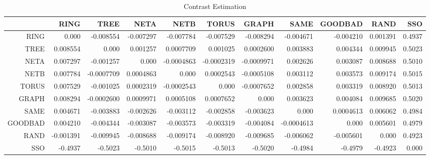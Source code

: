 \documentclass[a4paper,10pt]{article}
\begin{document}
\begin{landscape}
\begin{table}[!htp]
\centering\tiny
\caption{Contrast Estimation}
\begin{tabular}{
|r|r|r|r|r|r|r|r|r|r|r|}
\hline
 & RING& TREE& NETA& NETB& TORUS& GRAPH& SAME& GOODBAD& RAND& SSO\\
\hline
 RING&0.000&-0.008554&-0.007297&-0.007784&-0.007529&-0.008294&-0.004671&-0.004210&0.001391&0.4937\\
\hline
 TREE&0.008554&0.000&0.001257&0.0007709&0.001025&0.0002600&0.003883&0.004344&0.009945&0.5023\\
\hline
 NETA&0.007297&-0.001257&0.000&-0.0004863&-0.0002319&-0.0009971&0.002626&0.003087&0.008688&0.5010\\
\hline
 NETB&0.007784&-0.0007709&0.0004863&0.000&0.0002543&-0.0005108&0.003112&0.003573&0.009174&0.5015\\
\hline
 TORUS&0.007529&-0.001025&0.0002319&-0.0002543&0.000&-0.0007652&0.002858&0.003319&0.008920&0.5013\\
\hline
 GRAPH&0.008294&-0.0002600&0.0009971&0.0005108&0.0007652&0.000&0.003623&0.004084&0.009685&0.5020\\
\hline
 SAME&0.004671&-0.003883&-0.002626&-0.003112&-0.002858&-0.003623&0.000&0.0004613&0.006062&0.4984\\
\hline
 GOODBAD&0.004210&-0.004344&-0.003087&-0.003573&-0.003319&-0.004084&-0.0004613&0.000&0.005601&0.4979\\
\hline
 RAND&-0.001391&-0.009945&-0.008688&-0.009174&-0.008920&-0.009685&-0.006062&-0.005601&0.000&0.4923\\
\hline
 SSO&-0.4937&-0.5023&-0.5010&-0.5015&-0.5013&-0.5020&-0.4984&-0.4979&-0.4923&0.000\\
\hline

\end{tabular}
\end{table}

\newpage


\end{landscape}
\end{document}
